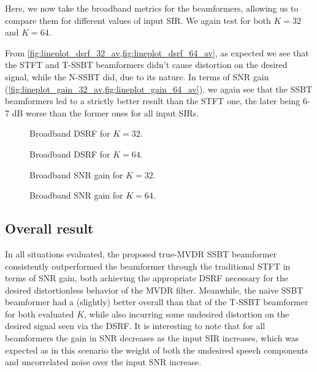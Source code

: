 Here, we now take the broadband metrics for the beamformers, allowing us to compare them for different values of input SIR. We again test for both $K = 32$ and $K = 64$.

From \cref{fig:lineplot_dsrf_32_av,fig:lineplot_dsrf_64_av}, as expected we see that the STFT and T-SSBT beamformers didn't cause distortion on the desired signal, while the N-SSBT did, due to its nature. In terms of SNR gain (\cref{fig:lineplot_gain_32_av,fig:lineplot_gain_64_av}), we again see that the SSBT beamformers led to a strictly better result than the STFT one, the later being 6-7 dB worse than the former ones for all input SIRs.

\begin{figure}[H]
	\centering
	
	\caption{Broadband DSRF for $K = 32$.}
	\label{fig:lineplot_dsrf_32_av}
\end{figure}

\begin{figure}[H]
	\centering
	
	\caption{Broadband DSRF for $K = 64$.}
	\label{fig:lineplot_dsrf_64_av}
\end{figure}

\begin{figure}[H]
	\centering
	
	\caption{Broadband SNR gain for $K = 32$.}
	\label{fig:lineplot_gain_32_av}
\end{figure}

\begin{figure}[H]
	\centering
	
	\caption{Broadband SNR gain for $K = 64$.}
	\label{fig:lineplot_gain_64_av}
	\end{figure}

\subsection{Overall result}

In all situations evaluated, the proposed true-MVDR SSBT beamformer consistently outperformed the beamformer through the traditional STFT in terms of SNR gain, both achieving the appropriate DSRF necessary for the desired distortionless behavior of the MVDR filter. Meanwhile, the naive SSBT beamformer had a (slightly) better overall than that of the T-SSBT beamformer for both evaluated $K$, while also incurring some undesired distortion on the desired signal seen via the DSRF. It is interesting to note that for all beamformers the gain in SNR decreases as the input SIR increases, which was expected as in this scenario the weight of both the undesired speech components and uncorrelated noise over the input SNR increase.